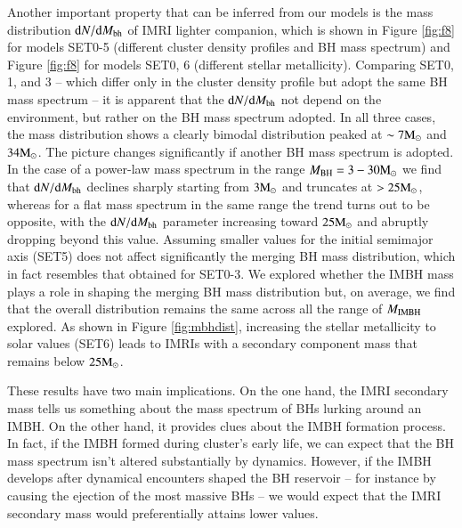 \documentclass[article]{aa}
\newcommand{\Ms}{{\rm M}_\odot}
\newcommand{\ibh}{{\rm IMBH}}
\newcommand{\bh}{{\rm BH}}
\begin{document}
{Another important property that can be inferred from our models is the mass distribution ${\rm d}N/{\rm d}M_{\rm bh}$ of IMRI lighter companion, which is shown in Figure \ref{fig:f8} for models SET0-5 (different cluster density profiles and BH mass spectrum) and Figure \ref{fig:f8} for models SET0, 6 (different stellar metallicity). Comparing SET0, 1, and 3 -- which differ only in the cluster density profile but adopt the same BH mass spectrum \citep{spera17} -- it is apparent that the ${\rm d}N/{\rm d}M_{\rm bh}$ not depend on the environment, but rather on the BH mass spectrum adopted. In all three cases, the mass distribution shows a clearly bimodal distribution peaked at $\sim 7\Ms$ and $34\Ms$. The picture changes significantly if another BH mass spectrum is adopted. In the case of a power-law mass spectrum in the range $M_\bh = 3-30\Ms$ we find that ${\rm d}N/{\rm d}M_{\rm bh}$ declines sharply starting from $3\Ms$ and truncates at $> 25 \Ms$, whereas for a flat mass spectrum in the same range the trend turns out to be opposite, with the ${\rm d}N/{\rm d}M_{\rm bh}$ parameter increasing toward $25 \Ms$ and abruptly dropping beyond this value. Assuming smaller values for the initial semimajor axis (SET5) does not affect significantly the merging BH mass distribution, which in fact resembles that obtained for SET0-3. We explored whether the IMBH mass plays a role in shaping the merging BH mass distribution but, on average, we find that the overall distribution remains the same across all the range of $M_\ibh$ explored. As shown in Figure \ref{fig:mbhdist}, increasing the stellar metallicity to solar values (SET6) leads to IMRIs with a secondary component mass that remains below $25\Ms$. 

These results have two main implications. On the one hand, the IMRI secondary mass tells us something about the mass spectrum of BHs lurking around an IMBH. On the other hand, it provides clues about the IMBH formation process. In fact, if the IMBH formed during cluster's early life, we can expect that the BH mass spectrum isn't altered substantially by dynamics. However, if the IMBH develops after dynamical encounters shaped the BH reservoir -- for instance by causing the ejection of the most massive BHs -- we would expect that the IMRI secondary mass would preferentially attains lower values.

}
\end{document}
